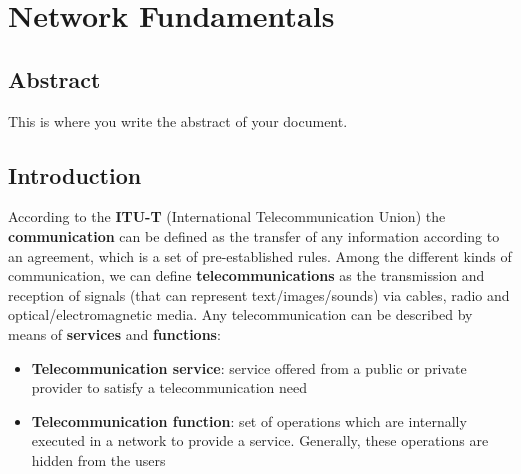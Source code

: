 \chapter[Network Fundamentals]{Network Fundamentals}

\section*{Abstract}         %
This is where you write the abstract of your document.

\section{Introduction}
According to the \textbf{ITU-T} (International Telecommunication Union) the \textbf{communication} can be defined as the transfer of any information according to an agreement, which is a set of pre-established rules. Among the different kinds of communication, we can define \textbf{telecommunications} as the transmission and reception of signals (that can represent text/images/sounds) via cables, radio and optical/electromagnetic media. Any telecommunication can be described by means of \textbf{services} and \textbf{functions}:
\begin{itemize}
    \item \textbf{Telecommunication service}: service offered from a public or private provider to satisfy a telecommunication need
    \item \textbf{Telecommunication function}: set of operations which are internally executed in a network to provide a service. Generally, these operations are hidden from the users
\end{itemize}

